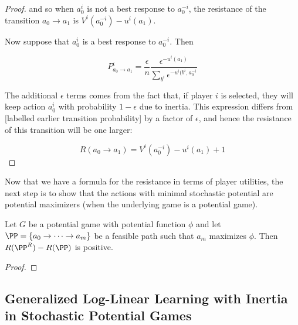 \begin{proof}
and so when $a^i_0$ is not a best response to $a^{-i}_0$, the resistance of the transition $a_0 \rightarrow a_1$ is $V^i(a_0^{-i}) - u^i(a_1)$.

Now suppose that $a^i_0$ is a best response to $a^{-i}_0$. Then

$$
P^{\epsilon}_{a_0 \rightarrow a_1} = \dfrac{\epsilon}{n} \dfrac{\epsilon^{-u^i(a_1)}}{\sum_{b^i} \epsilon^{-u^i(b^i, a^{-i}_0}}
$$

The additional $\epsilon$ terms comes from the fact that, if player $i$ is selected, they will keep action $a^i_0$ with probability $1-\epsilon$ due to inertia. This expression differs from [labelled earlier transition probability] by a factor of $\epsilon$, and hence the resistance of this transition will be one larger:

$$
R(a_0 \rightarrow a_1) = V^i(a_0^{-i}) - u^i(a_1) + 1
$$
\end{proof}


Now that we have a formula for the resistance in terms of player utilities, the next step is to show that the actions with minimal stochastic potential are potential maximizers (when the underlying game is a potential game). 

\begin{lem}
Let $G$ be a potential game with potential function $\phi$ and let $\PP = \{a_0 \rightarrow \cdots \rightarrow a_m\}$ be a feasible path such that $a_m$ maximizes $\phi$. Then $R(\PP^R) - R(\PP)$ is positive.
\end{lem}

\begin{proof}

\end{proof}

\subsection{Generalized Log-Linear Learning with Inertia in Stochastic Potential Games}























